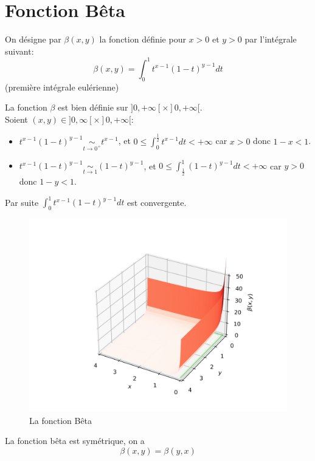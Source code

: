 \section{Fonction Bêta}
\begin{definition}
On désigne par $\beta(x,y)$ la fonction définie pour $x>0$ et $y>0$
par l’intégrale suivant:
    \begin{equation}
        \beta(x,y) = \int_{0}^{1} t^{x-1}(1-t)^{y-1} dt
    \end{equation}
    (première intégrale eulérienne)
\end{definition}

La fonction $\beta$ est bien définie sur $]0,+\infty[\times]0,+\infty[$.\\
Soient $(x,y)\in]0,\infty[\times]0,+\infty[:$\\
\begin{itemize}
    \item $t^{x-1}(1-t)^{y-1} \underset{t \to 0^+}{\sim} t^{x-1}$, et $0\leq \int_0^{\frac{1}{2}} t^{x-1}dt < +\infty $  car  $x>0$ donc $1-x<1$.
    \item $t^{x-1}(1-t)^{y-1}\underset{t \to{1}}{\sim}(1-t)^{y-1}$, et $0\leq\int_{\frac{1}{2}}^1 (1-t)^{y-1} dt <+\infty$ car $y>0$ donc $1-y<1$. 
\end{itemize}
Par suite $\int_0^1 t^{x-1}(1-t)^{y-1}dt$ est convergente.
\begin{figure}[H]
    \centering
    \includegraphics[scale = 0.7]{IMAGES/betaFunc.png}
    \caption{La fonction Bêta}
\end{figure}
\begin{theoreme}
    La fonction bêta est symétrique, on a
    \begin{equation}
        \beta(x,y)=\beta(y,x)
    \end{equation}
\end{theoreme}
